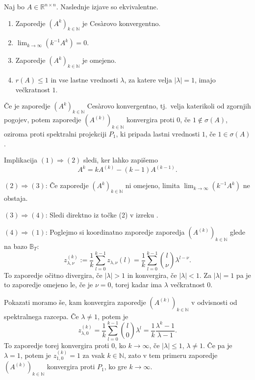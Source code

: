 \documentclass[mat1]{fmfdelo}
\newcommand{\R}{\mathbb R}
\newcommand{\N}{\mathbb N}
\begin{document}
\begin{izrek}\label{izrekCesaro}
    Naj bo $A \in \R^{n \times n}$. Naslednje izjave so ekvivalentne.
    \begin{enumerate}
        \item Zaporedje $(A^k)_{k\in\N}$ je Ces\`arovo konvergentno.
        \item $\lim_{k\rightarrow \infty} \left(k^{-1}A^k\right) = 0$.
        \item Zaporedje $(A^k)_{k\in\N}$ je omejeno.
        \item $r(A) \leq 1$ in vse lastne vrednosti $\lambda$, za katere velja $|\lambda| = 1$, imajo večkratnost $1$.
    \end{enumerate}
    Če je zaporedje $(A^k)_{k\in\N}$ Ces\`arovo konvergentno, tj.\ velja katerikoli od zgornjih pogojev, potem zaporedje $(A^{(k)})_{k\in\N}$ konvergira proti $0$, če $1 \notin \sigma(A)$, oziroma proti spektralni projekciji $P_1$, ki pripada lastni vrednosti $1$, če $1\in\sigma(A)$.
\end{izrek}
\begin{dokaz}
    Implikacija $(1) \Rightarrow (2)$ sledi, ker lahko zapišemo
    \begin{equation*}
        A^k = k A^{(k)} - (k-1) A^{(k-1)}.
    \end{equation*}

    \noindent $(2) \Rightarrow (3)$: Če zaporedje $(A^k)_{k\in\N}$ ni omejeno, limita $\lim_{k\rightarrow \infty} (k^{-1}A^k)$ ne obstaja.
    
    \noindent $(3) \Rightarrow (4)$: Sledi direktno iz točke (2) v izreku .
    
    \noindent $(4) \Rightarrow (1)$: Poglejmo si koordinatno zaporedje zaporedja $(A^{(k)})_{k\in\N}$ glede na bazo $\mathbb{B}_T$:
    \begin{equation*}
        z_{\lambda, \nu}^{(k)} := \frac{1}{k} \sum_{l=0}^{k-1} z_{\lambda, \nu} (l) = \frac{1}{k} \sum_{l=0}^{k-1}{l \choose \nu} \lambda^{l - \nu}.
    \end{equation*}
    To zaporedje očitno divergira, če $|\lambda| > 1$ in konvergira, če $|\lambda| < 1$. Za $|\lambda| = 1$ pa je to zaporedje omejeno le, če je $\nu = 0$, torej kadar ima $\lambda$ večkratnost $0$.

    \noindent Pokazati moramo še, kam konvergira zaporedje $(A^{(k)})_{k\in\N}$ v odvisnosti od spektralnega razcepa. Če $\lambda \neq 1$, potem je
    \begin{equation*}
        z_{\lambda, 0}^{(k)} = \frac{1}{k} \sum_{l=0}^{k-1}{l \choose 0} \lambda^{l} = \frac{1}{k}\frac{\lambda^k-1}{\lambda-1}.
    \end{equation*}
    To zaporedje torej konvergira proti $0$, ko $k\rightarrow\infty$, če $|\lambda|\leq 1$, $\lambda \neq 1$. Če pa je $\lambda = 1$, potem je $z_{1, 0}^{(k)} = 1$ za vsak $k \in \N$, zato v tem primeru zaporedje $(A^{(k)})_{k\in\N}$ konvergira proti $P_1$, ko gre $k\rightarrow\infty$.

\end{dokaz}
\end{document}
